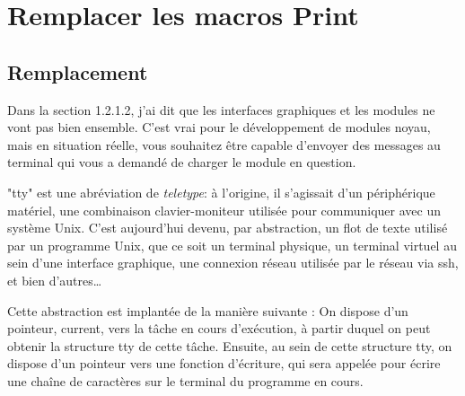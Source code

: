 \documentclass[11pt]{article}
\begin{document}
\section*{Remplacer les macros Print}
\label{sec-13}

\subsection*{Remplacement}
\label{sec-13-1}
Dans la section 1.2.1.2, j'ai dit que les interfaces graphiques et les modules ne vont pas bien ensemble. C'est vrai pour le développement de modules noyau, mais en situation réelle, vous souhaitez être capable d'envoyer des messages au terminal qui vous a demandé de charger le module en question.

"tty" est une abréviation de \emph{teletype}: à l'origine, il s'agissait d'un périphérique matériel, une combinaison clavier-moniteur utilisée pour communiquer avec un système Unix. C'est aujourd'hui devenu, par abstraction, un flot de texte utilisé par un programme Unix, que ce soit un terminal physique, un terminal virtuel au sein d'une interface graphique, une connexion réseau utilisée par le réseau via ssh, et bien d'autres\ldots{}

Cette abstraction est implantée de la manière suivante : On dispose d'un pointeur, current, vers la tâche en cours d'exécution, à partir duquel on peut obtenir la structure tty de cette tâche. Ensuite, au sein de cette structure tty, on dispose d'un pointeur vers une fonction d'écriture, qui sera appelée pour écrire une chaîne de caractères sur le terminal du programme en cours.
\end{document}
